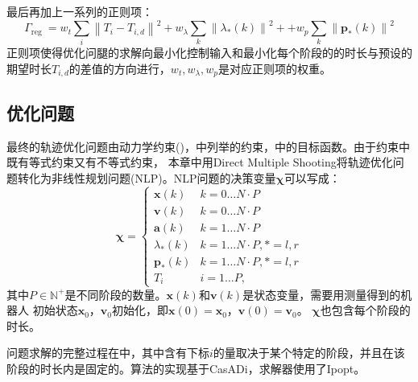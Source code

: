 最后再加上一系列的正则项：
\begin{equation}
    \label{equ:cost_4}
    \Gamma_{\text {reg }}=  w_t \sum_i\left\|T_i-T_{i, d}\right\|^2+w_\lambda \sum_k\left\|\lambda_*(k)\right\|^2+ 
        +w_p \sum_k\left\|\boldsymbol{p}_*(k)\right\|^2
\end{equation}
正则项使得优化问腿的求解向最小化控制输入和最小化每个阶段的的时长与预设的期望时长$T_{i, d}$的差值的方向进行，$w_t, w_\lambda, w_p$是对应正则项的权重。
\subsection{优化问题}
最终的轨迹优化问题由动力学约束()，中列举的约束，中的目标函数。由于约束中既有等式约束又有不等式约束，
本章中用Direct Multiple Shooting将轨迹优化问题转化为非线性规划问题(NLP)。NLP问题的决策变量$\boldsymbol{\chi}$可以写成：
\begin{equation}
    \label{equ:decision_variable}
    \boldsymbol{\chi} = \begin{cases}\boldsymbol{x}(k) & k=0 \ldots N \cdot P \\ \boldsymbol{v}(k) & k=0 \ldots N \cdot P \\ \boldsymbol{a}(k) & k=1 \ldots N \cdot P \\ \lambda_*(k) & k=1 \ldots N \cdot P, *=l, r \\ \boldsymbol{p}_*(k) & k=1 \ldots N \cdot P, *=l, r \\ T_i & i=1 \ldots P,\end{cases}
\end{equation}
其中$P \in \mathbb{N}^+$是不同阶段的数量。$\boldsymbol{x}(k)$和$\boldsymbol{v}(k)$是状态变量，需要用测量得到的机器人
初始状态$\boldsymbol{x}_0$，$\boldsymbol{v}_0$初始化，即$\boldsymbol{x}(0)=\boldsymbol{x}_0$，$\boldsymbol{v}(0)=\boldsymbol{v}_0$。
$\boldsymbol{\chi}$也包含每个阶段的时长。

问题求解的完整过程在中，其中含有下标$i$的量取决于某个特定的阶段，并且在该阶段的时长内是固定的。算法的实现基于CasADi\cite{andersson2019casadi}，求解器使用了Ipopt。

